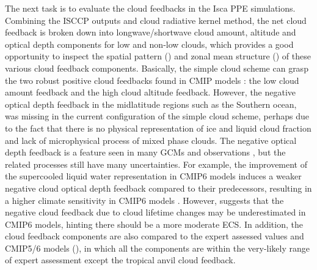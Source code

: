 The next task is to evaluate the cloud feedbacks in the Isca PPE simulations. Combining the ISCCP outputs and cloud radiative kernel method, the net cloud feedback is broken down into longwave/shortwave cloud amount, altitude and optical depth components for low and non-low clouds, which provides a good opportunity to inspect the spatial pattern () and zonal mean structure () of these various cloud feedback components. Basically, the simple cloud scheme can grasp the two robust positive cloud feedbacks found in CMIP models \citep[e.g.,][]{Zelinka2016insights}: the low cloud amount feedback and the high cloud altitude feedback. However, the negative optical depth feedback in the midlatitude regions such as the Southern ocean, was missing in the current configuration of the simple cloud scheme,  perhaps due to the fact that there is no physical representation of ice and liquid cloud fraction and lack of microphysical process of mixed phase clouds. The negative optical depth feedback is a feature seen in many GCMs \citep[e.g.,][]{Zelinka2016insights,Ceppi2017,Zelinka2020causes} and observations \citep[e.g.,][]{Tan2016observational}, but the related processes still have many uncertainties. For example, the improvement of the supercooled liquid water representation in CMIP6 models induces a weaker negative cloud optical depth feedback compared to their predecessors, resulting in a higher climate sensitivity in CMIP6 models \citep{Zelinka2020causes}. However, \cite{Mulmenstadt2021underestimated} suggests that the negative cloud feedback due to cloud lifetime changes may be underestimated in CMIP6 models, hinting there should be a more moderate ECS. In addition, the cloud feedback components are also compared to the expert assessed values \citep{Sherwood2020} and CMIP5/6 models (), in which all the components are within the very-likely range of expert assessment except the tropical anvil cloud feedback.



